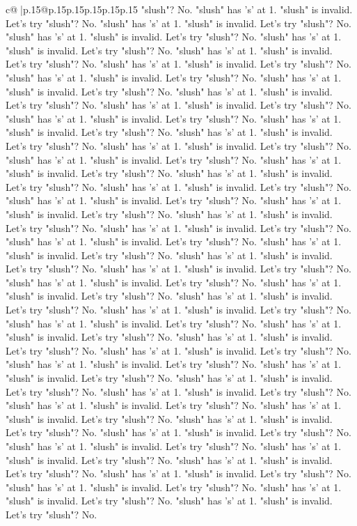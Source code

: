 \documentclass{article}
\begin{document}
{\begin{supertabular}{c@{$\;$}|p{.15\linewidth}@{}p{.15\linewidth}p{.15\linewidth}p{.15\linewidth}p{.15\linewidth}p{.15\linewidth}}
{{{"slush"? No. "slush" has 's' at 1. "slush" is invalid. Let's try "slush"? No. "slush" has 's' at 1. "slush" is invalid. Let's try "slush"? No. "slush" has 's' at 1. "slush" is invalid. Let's try "slush"? No. "slush" has 's' at 1. "slush" is invalid. Let's try "slush"? No. "slush" has 's' at 1. "slush" is invalid. Let's try "slush"? No. "slush" has 's' at 1. "slush" is invalid. Let's try "slush"? No. "slush" has 's' at 1. "slush" is invalid. Let's try "slush"? No. "slush" has 's' at 1. "slush" is invalid. Let's try "slush"? No. "slush" has 's' at 1. "slush" is invalid. Let's try "slush"? No. "slush" has 's' at 1. "slush" is invalid. Let's try "slush"? No. "slush" has 's' at 1. "slush" is invalid. Let's try "slush"? No. "slush" has 's' at 1. "slush" is invalid. Let's try "slush"? No. "slush" has 's' at 1. "slush" is invalid. Let's try "slush"? No. "slush" has 's' at 1. "slush" is invalid. Let's try "slush"? No. "slush" has 's' at 1. "slush" is invalid. Let's try "slush"? No. "slush" has 's' at 1. "slush" is invalid. Let's try "slush"? No. "slush" has 's' at 1. "slush" is invalid. Let's try "slush"? No. "slush" has 's' at 1. "slush" is invalid. Let's try "slush"? No. "slush" has 's' at 1. "slush" is invalid. Let's try "slush"? No. "slush" has 's' at 1. "slush" is invalid. Let's try "slush"? No. "slush" has 's' at 1. "slush" is invalid. Let's try "slush"? No. "slush" has 's' at 1. "slush" is invalid. Let's try "slush"? No. "slush" has 's' at 1. "slush" is invalid. Let's try "slush"? No. "slush" has 's' at 1. "slush" is invalid. Let's try "slush"? No. "slush" has 's' at 1. "slush" is invalid. Let's try "slush"? No. "slush" has 's' at 1. "slush" is invalid. Let's try "slush"? No. "slush" has 's' at 1. "slush" is invalid. Let's try "slush"? No. "slush" has 's' at 1. "slush" is invalid. Let's try "slush"? No. "slush" has 's' at 1. "slush" is invalid. Let's try "slush"? No. "slush" has 's' at 1. "slush" is invalid. Let's try "slush"? No. "slush" has 's' at 1. "slush" is invalid. Let's try "slush"? No. "slush" has 's' at 1. "slush" is invalid. Let's try "slush"? No. "slush" has 's' at 1. "slush" is invalid. Let's try "slush"? No. "slush" has 's' at 1. "slush" is invalid. Let's try "slush"? No. "slush" has 's' at 1. "slush" is invalid. Let's try "slush"? No. "slush" has 's' at 1. "slush" is invalid. Let's try "slush"? No. "slush" has 's' at 1. "slush" is invalid. Let's try "slush"? No. "slush" has 's' at 1. "slush" is invalid. Let's try "slush"? No. "slush" has 's' at 1. "slush" is invalid. Let's try "slush"? No. "slush" has 's' at 1. "slush" is invalid. Let's try "slush"? No. "slush" has 's' at 1. "slush" is invalid. Let's try "slush"? No. "slush" has 's' at 1. "slush" is invalid. Let's try "slush"? No. "slush" has 's' at 1. "slush" is invalid. Let's try "slush"? No. "slush" has 's' at 1. "slush" is invalid. Let's try "slush"? No. "slush" has 's' at 1. "slush" is invalid. Let's try "slush"? No. "slush" has 's' at 1. "slush" is invalid. Let's try "slush"? No. "slush" has 's' at 1. "slush" is invalid. Let's try "slush"? No. "slush" has 's' at 1. "slush" is invalid. Let's try "slush"? No. "slush" has 's' at 1. "slush" is invalid. Let's try "slush"? No. }}}
\end{supertabular}}
\end{document}
